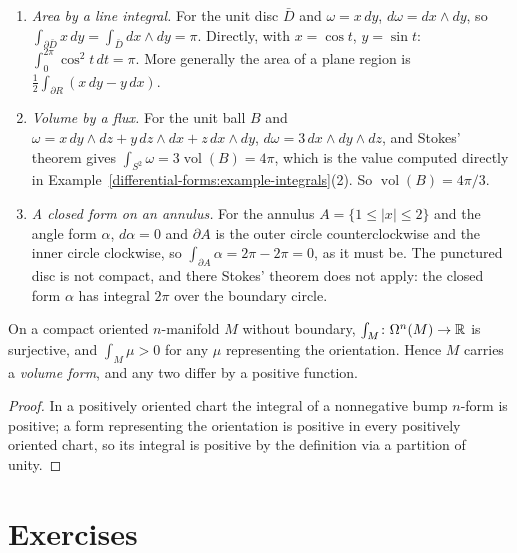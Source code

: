 \begin{example}\label{differential-forms:example-stokes-checks}
\begin{enumerate}
\item \emph{Area by a line integral.} For the unit disc $\bar D$ and $\omega = x\,dy$, $d\omega = dx \wedge dy$, so $\int_{\partial\bar D}x\,dy = \int_{\bar D}dx \wedge dy = \pi$. Directly, with
$x = \cos t$, $y = \sin t$: $\int_0^{2\pi}\cos^2t\,dt = \pi$. More generally the area of a plane region is $\frac12\int_{\partial R}(x\,dy - y\,dx)$.
\item \emph{Volume by a flux.} For the unit ball $B$ and $\omega = x\,dy \wedge dz + y\,dz \wedge dx + z\,dx \wedge dy$, $d\omega = 3\,dx \wedge dy \wedge dz$, and Stokes' theorem gives
$\int_{S^2}\omega = 3\operatorname{vol}(B) = 4\pi$, which is the value computed directly in Example~\ref{differential-forms:example-integrals}(2). So $\operatorname{vol}(B) = 4\pi/3$.
\item \emph{A closed form on an annulus.} For the annulus $A = \{1 \leq |x| \leq 2\}$ and the angle form $\alpha$, $d\alpha = 0$ and $\partial A$ is the outer circle counterclockwise and the
inner circle clockwise, so $\int_{\partial A}\alpha = 2\pi - 2\pi = 0$, as it must be. The punctured disc is not compact, and there Stokes' theorem does not apply: the closed form $\alpha$
has integral $2\pi$ over the boundary circle.
\end{enumerate}
\end{example}

\begin{corollary}\label{differential-forms:corollary-volume}
On a compact oriented $n$-manifold $M$ without boundary, $\int_M \colon \Omega^n(M) \to \mathbb{R}$ is surjective, and $\int_M\mu > 0$ for any $\mu$ representing the orientation. Hence $M$ carries a \emph{volume
form}, and any two differ by a positive function.
\end{corollary}

\begin{proof}
In a positively oriented chart the integral of a nonnegative bump $n$-form is positive; a form representing the orientation is positive in every positively oriented chart, so its integral is positive by the
definition via a partition of unity.
\end{proof}

\section{Exercises}\label{differential-forms:section-exercises}

